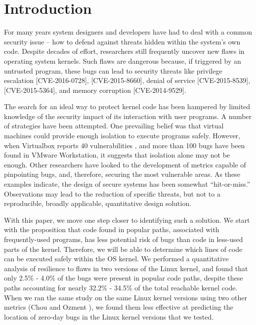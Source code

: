\section{Introduction}
\label{sec.introduction}

For many years system designers and developers have had to deal with a common security issue --
how to defend against threats hidden within the system's own code. Despite
 decades of effort, researchers still frequently uncover new flaws in operating
 system kernels. Such flaws are dangerous because, if triggered by an untrusted
 program, these bugs can lead to security threats like privilege escalation
 [CVE-2016-0728], [CVE-2015-8660], denial of service [CVE-2015-8539], [CVE-2015-5364],
  and memory corruption [CVE-2014-9529].

The search for an ideal way to protect kernel code has been hampered by limited
knowledge of the security impact of its interaction with user programs.
A number of strategies have been attempted. One prevailing belief was that virtual
machines could provide enough isolation to execute programs safely.
However, when Virtualbox reports 40 vulnerabilities \cite{Virtualbox-Vulnerabilities},
 and more than 100 bugs have been found in VMware Workstation,
it suggests that isolation alone may not be enough. Other researchers have looked
 to the development of metrics capable of pinpointing bugs, and, therefore,
securing the most vulnerable areas\cite{PittSFIeld, ozment2006milk}. As these
examples indicate, the design of secure systems has been somewhat “hit-or-miss.”
 Observations may lead to
 the reduction of specific threats, but not to a reproducible, broadly applicable,
quantitative design solution.

With this paper, we move one step closer to identifying such a solution. We start
 with the proposition that code found in popular paths, associated with frequently-used programs,
has less potential risk of bugs than code in less-used parts of the kernel.
Therefore, we will be able to determine which lines of code can be executed
 safely within the OS kernel. We performed a quantitative analysis of resilience
  to flaws in two versions of the Linux kernel, and
found that only 2.5\% - 4.0\% of the bugs were present in popular code paths,
despite these paths accounting for nearly 32.2\% - 34.5\% of the total reachable kernel code.
When we ran the same study on the same Linux kernel versions using two other metrics
(Chou \cite{PittSFIeld} and Ozment \cite{ozment2006milk}),
we found them less effective at predicting the location of zero-day bugs in the
Linux kernel versions that we tested.


